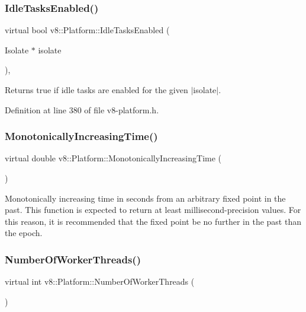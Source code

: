 \subsubsection{\texorpdfstring{Idle\+Tasks\+Enabled()}{IdleTasksEnabled()}}
{\footnotesize\ttfamily virtual bool v8\+::\+Platform\+::\+Idle\+Tasks\+Enabled (\begin{DoxyParamCaption}\item[{Isolate $\ast$}]{isolate }\end{DoxyParamCaption})\hspace{0.3cm}{\ttfamily [inline]}, {\ttfamily [virtual]}}

Returns true if idle tasks are enabled for the given $\vert$isolate$\vert$. 

Definition at line 380 of file v8-\/platform.\+h.

\mbox{\label{classv8_1_1Platform_a6d4d7c2dcf6b0c7113099b97fa7f57b7}} 
\subsubsection{\texorpdfstring{Monotonically\+Increasing\+Time()}{MonotonicallyIncreasingTime()}}
{\footnotesize\ttfamily virtual double v8\+::\+Platform\+::\+Monotonically\+Increasing\+Time (\begin{DoxyParamCaption}{ }\end{DoxyParamCaption})\hspace{0.3cm}{\ttfamily [pure virtual]}}

Monotonically increasing time in seconds from an arbitrary fixed point in the past. This function is expected to return at least millisecond-\/precision values. For this reason, it is recommended that the fixed point be no further in the past than the epoch. \mbox{\label{classv8_1_1Platform_a57cdd7eb4c482bfb806c378beeda716d}} 
\subsubsection{\texorpdfstring{Number\+Of\+Worker\+Threads()}{NumberOfWorkerThreads()}}
{\footnotesize\ttfamily virtual int v8\+::\+Platform\+::\+Number\+Of\+Worker\+Threads (\begin{DoxyParamCaption}{ }\end{DoxyParamCaption})\hspace{0.3cm}{\ttfamily [pure virtual]}}

